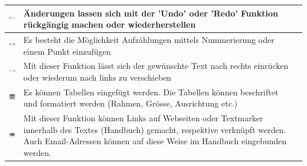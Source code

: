\begin{tabular}{c | p{14cm} l}
\hline
\includegraphics[height=12pt]{../chapters/09_Qualitaetsmanagement/pictures/Format/Undo.jpg} & Änderungen lassen sich mit der 'Undo' oder 'Redo' Funktion rückgängig machen oder wiederherstellen \\
\hline
\includegraphics[height=12pt]{../chapters/09_Qualitaetsmanagement/pictures/Format/Aufzaehlung.jpg} & Es besteht die Möglichkeit Aufzählungen mittels Nummerierung oder einem Punkt einzufügen \\
\hline
\includegraphics[height=12pt]{../chapters/09_Qualitaetsmanagement/pictures/Format/Einruecken.jpg} & Mit dieser Funktion lässt sich der gewünschte Text nach rechts einrücken oder wiederum nach links zu verschieben \\
\hline
\includegraphics[height=12pt]{../chapters/09_Qualitaetsmanagement/pictures/Format/Tabellen.jpg} & Es können Tabellen eingefügt werden. Die Tabellen können beschriftet und formatiert werden (Rahmen, Grösse, Ausrichtung etc.) \\
\hline
\includegraphics[height=12pt]{../chapters/09_Qualitaetsmanagement/pictures/Format/Link.jpg} & Mit dieser Funktion können Links auf Webseiten oder Textmarker innerhalb des Textes (Handbuch) gemacht, respektive verknüpft werden. Auch Email-Adressen können auf diese Weise im Handbuch eingebunden werden. \\
\hline
\end{tabular}





